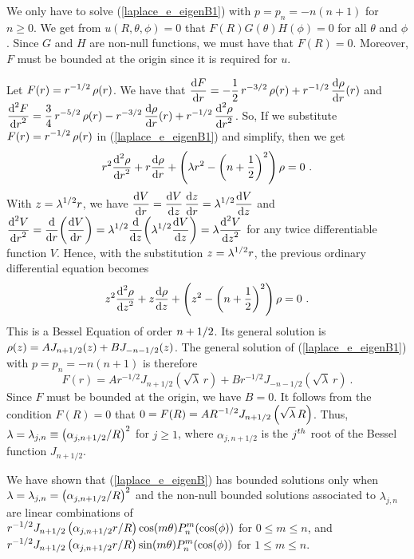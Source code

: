 We only have to solve (\ref{laplace_e_eigenB1}) with $p=p_n=-n(n+1)$ for
$n \geq 0$.  We get from $u(R,\theta,\phi) = 0$ that
$F(R)G(\theta)H(\phi) = 0$ for all $\theta$ and $\phi$.
Since $G$ and $H$ are non-null functions, we must have that $F(R)=0$.
Moreover, $F$ must be bounded at the origin since it is required for $u$.

Let $\DS F(r) = r^{-1/2}\,\rho(r)$.  We have that
$\DS \dydx{F}{r} = -\frac{1}{2}\,r^{-3/2} \, \rho(r) +
r^{-1/2}\,\dydx{\rho}{r}(r)$ and\\
$\DS \dydxn{F}{r}{2} = \frac{3}{4}\,r^{-5/2} \, \rho(r) -
r^{-3/2}\,\dydx{\rho}{r}(r) + r^{-1/2}\,\dydxn{\rho}{r}{2}$.
So, If we substitute $\DS F(r) = r^{-1/2}\,\rho(r)$
in (\ref{laplace_e_eigenB1}) and simplify, then we get
\[
r^2 \dydxn{\rho}{r}{2} + r \dydx{\rho}{r} + \left(\lambda r^2 -
  \left( n + \frac{1}{2}\right)^2\right)\rho = 0 \  .
\]
With $\DS z = \lambda^{1/2} r$, we have
$\DS
\dydx{V}{r} = \dydx{V}{z} \, \dydx{z}{r} = \lambda^{1/2} \dydx{V}{z}$
and \\
$\DS \dydxn{V}{r}{2} = \dfdx{ \left( \dydx{V}{r}\right) }{r} =
\lambda^{1/2} \dfdx{ \left(\lambda^{1/2} \dydx{V}{z} \right) }{z}
= \lambda \dydxn{V}{z}{2}$
for any twice differentiable function $V$.  Hence, with the
substitution $\DS z=\lambda^{1/2} r$, the previous ordinary
differential equation becomes
\[
z^2 \dydxn{\rho}{z}{2} + z \dydx{\rho}{z} + \left( z^2 - 
\left( n + \frac{1}{2}\right)^2\right)\rho = 0 \  .
\]
This is a Bessel Equation of order $\DS n + 1/2$.  Its
general solution is
$\DS \rho(z) = A J_{n+1/2}(z) + B J_{-n-1/2}(z)$.
The general solution of (\ref{laplace_e_eigenB1}) with $p=p_n=-n(n+1)$ is
therefore
\[
F(r) = A r^{-1/2} J_{n+1/2}\left(\sqrt{\lambda}\, r\right)
+ B r^{-1/2} J_{-n-1/2}\left(\sqrt{\lambda}\, r\right) \  .
\]
Since $F$ must be bounded at the origin, we have $B=0$.  It
follows from the condition $F(R)=0$ that
$\DS 0 = F(R) = A R^{-1/2} J_{n+1/2}\left(\sqrt{\lambda}\, R\right)$.
Thus, $\DS \lambda = \lambda_{j,n} \equiv
\left(\alpha_{j,n+1/2}/R\right)^2$ for $j \geq 1$, where
$\alpha_{j,n+1/2}$ is the $\DS j^{th}$ root of the Bessel
function $J_{n+1/2}$.

We have shown that (\ref{laplace_e_eigenB}) has bounded solutions only when
$\DS \lambda = \lambda_{j,n} =
\left(\alpha_{j,n+1/2}/R\right)^2$ and the non-null bounded
solutions associated to $\lambda_{j,n}$ are linear combinations of\\
$\DS
r^{-1/2} J_{n+1/2}\left(\alpha_{j,n+1/2} r/R\right)
\cos(m\theta)P_n^m(\cos(\phi))$ for $0 \leq m \leq n$, and\\
$\DS r^{-1/2} J_{n+1/2}\left(\alpha_{j,n+1/2} r/R\right)
\sin(m\theta)P_n^m(\cos(\phi))$ for $1 \leq m \leq n$.

